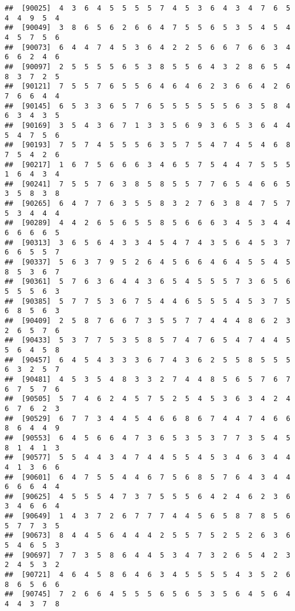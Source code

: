 \documentclass[
]{book}
\begin{document}
\begin{verbatim}
##  [90025]  4  3  6  4  5  5  5  5  7  4  5  3  6  4  3  4  7  6  5  4  4  9  5  4
##  [90049]  3  8  6  5  6  2  6  6  4  7  5  5  6  5  3  5  4  5  4  4  5  7  5  6
##  [90073]  6  4  4  7  4  5  3  6  4  2  2  5  6  6  7  6  6  3  4  6  6  2  4  6
##  [90097]  2  5  5  5  5  6  5  3  8  5  5  6  4  3  2  8  6  5  4  8  3  7  2  5
##  [90121]  7  5  5  7  6  5  5  6  4  6  4  6  2  3  6  6  4  2  6  7  6  6  4  4
##  [90145]  6  5  3  3  6  5  7  6  5  5  5  5  5  5  6  3  5  8  4  6  3  4  3  5
##  [90169]  3  5  4  3  6  7  1  3  3  5  6  9  3  6  5  3  6  4  4  5  4  7  5  6
##  [90193]  7  5  7  4  5  5  5  6  3  5  7  5  4  7  4  5  4  6  8  7  5  4  2  6
##  [90217]  1  6  7  5  6  6  6  3  4  6  5  7  5  4  4  7  5  5  5  1  6  4  3  4
##  [90241]  7  5  5  7  6  3  8  5  8  5  5  7  7  6  5  4  6  6  5  3  5  8  3  8
##  [90265]  6  4  7  7  6  3  5  5  8  3  2  7  6  3  8  4  7  5  7  5  3  4  4  4
##  [90289]  4  4  2  6  5  6  5  5  8  5  6  6  6  3  4  5  3  4  4  6  6  6  6  5
##  [90313]  3  6  5  6  4  3  3  4  5  4  7  4  3  5  6  4  5  3  7  6  6  5  5  7
##  [90337]  5  6  3  7  9  5  2  6  4  5  6  6  4  6  4  5  5  4  5  8  5  3  6  7
##  [90361]  5  7  6  3  6  4  4  3  6  5  4  5  5  5  7  3  6  5  6  5  5  5  6  3
##  [90385]  5  7  7  5  3  6  7  5  4  4  6  5  5  5  4  5  3  7  5  6  8  5  6  3
##  [90409]  2  5  8  7  6  6  7  3  5  5  7  7  4  4  4  8  6  2  3  2  6  5  7  6
##  [90433]  5  3  7  7  5  3  5  8  5  7  4  7  6  5  4  7  4  4  5  5  6  4  5  8
##  [90457]  6  4  5  4  3  3  3  6  7  4  3  6  2  5  5  8  5  5  5  6  3  2  5  7
##  [90481]  4  5  3  5  4  8  3  3  2  7  4  4  8  5  6  5  7  6  7  6  7  5  7  6
##  [90505]  5  7  4  6  2  4  5  7  5  2  5  4  5  3  6  3  4  2  4  6  7  6  2  3
##  [90529]  6  7  7  3  4  4  5  4  6  6  8  6  7  4  4  7  4  6  6  8  6  4  4  9
##  [90553]  6  4  5  6  6  4  7  3  6  5  3  5  3  7  7  3  5  4  5  8  1  4  1  3
##  [90577]  5  5  4  4  3  4  7  4  4  5  5  4  5  3  4  6  3  4  4  4  1  3  6  6
##  [90601]  6  4  7  5  5  4  4  6  7  5  6  8  5  7  6  4  3  4  4  6  6  6  4  4
##  [90625]  4  5  5  5  4  7  3  7  5  5  5  6  4  2  4  6  2  3  6  3  4  6  6  4
##  [90649]  1  4  3  7  2  6  7  7  7  4  4  5  6  5  8  7  8  5  6  5  7  7  3  5
##  [90673]  8  4  4  5  6  4  4  4  2  5  5  7  5  2  5  2  6  3  6  5  4  6  5  3
##  [90697]  7  7  3  5  8  6  4  4  5  3  4  7  3  2  6  5  4  2  3  2  4  5  3  2
##  [90721]  4  6  4  5  8  6  4  6  3  4  5  5  5  5  4  3  5  2  6  8  6  5  6  6
##  [90745]  7  2  6  6  4  5  5  5  6  5  6  5  3  5  6  4  5  6  4  4  4  3  7  8

\end{verbatim}
\end{document}
